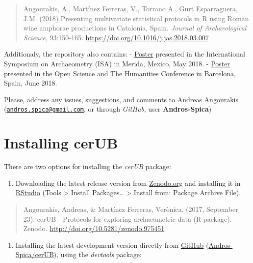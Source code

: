 \documentclass[12pt,]{book}
\providecommand{\tightlist}{%
  \setlength{\itemsep}{0pt}\setlength{\parskip}{0pt}}
\begin{document}
\begin{quote}
Angourakis, A., Martínez Ferreras, V., Torrano A., Gurt Esparraguera, J.M. (2018) Presenting multivariate statistical protocols in R using Roman wine amphorae productions in Catalonia, Spain. \emph{Journal of Archaeological Science}, 93:150-165. \url{https://doi.org/10.1016/j.jas.2018.03.007}
\end{quote}

Additionaly, the repository also contains:
- \href{https://github.com/Andros-Spica/cerUB_tutorial/blob/master/poster_ISA2018/ISA2018_Angourakis_et_al.pdf}{Poster} presented in the International Symposium on Archaeometry (ISA) in Merida, Mexico, May 2018.
- \href{https://github.com/Andros-Spica/cerUB_tutorial/tree/master/poster_OpenScienceHumanities2018/OSH2018_Angourakis_et_al.pdf}{Poster} presented in the Open Science and The Humanities Conference in Barcelona, Spain, June 2018.

Please, address any issues, suggestions, and comments to Andreas Angourakis (\href{mailto:andros.spica@gmail.com}{\nolinkurl{andros.spica@gmail.com}}, or through \emph{GitHub}, user \textbf{Andros-Spica})

\hypertarget{install}{%
\chapter{Installing cerUB}\label{install}}

There are two options for installing the \emph{cerUB} package:

\begin{enumerate}
\def\labelenumi{\alph{enumi}.}
\tightlist
\item
  Downloading the latest release version from \href{zenodo.org}{Zenodo.org} and installing it in \href{rstudio.com}{RStudio} (Tools \textgreater{} Install Packages\ldots{} \textgreater{} Install from: Package Archive File).
\end{enumerate}

\begin{quote}
Angourakis, Andreas, \& Martínez Ferreras, Verònica. (2017, September 23). cerUB - Protocols for exploring archaeometric data (R package). Zenodo. \url{http://doi.org/10.5281/zenodo.975451}
\end{quote}

\begin{enumerate}
\def\labelenumi{\alph{enumi}.}
\setcounter{enumi}{1}
\tightlist
\item
  Installing the latest development version directly from \href{github.com}{GitHub} (\href{https://github.com/Andros-Spica/cerUB}{Andros-Spica/cerUB}), using the \emph{devtools} package:
\end{enumerate}
\end{document}
